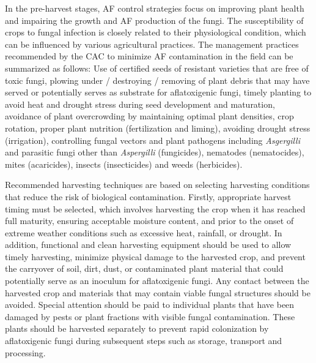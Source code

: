 In the pre-harvest stages, AF control strategies focus on improving plant health and impairing the growth and AF production of the fungi. The susceptibility of crops to fungal infection is closely related to their physiological condition, which can be influenced by various agricultural practices. The management practices recommended by the CAC to minimize AF contamination in the field can be summarized as follows: Use of certified seeds of resistant varieties that are free of toxic fungi, plowing under / destroying / removing of plant debris that may have served or potentially serves as substrate for aflatoxigenic fungi, timely planting to avoid heat and drought stress during seed development and maturation, avoidance of plant overcrowding by maintaining optimal plant densities, crop rotation, proper plant nutrition (fertilization and liming), avoiding drought stress (irrigation), controlling fungal vectors and plant pathogens including \textit{Asgergilli} and parasitic fungi other than \textit{Aspergilli} (fungicides), nematodes (nematocides), mites (acaricides), insects (insecticides) and weeds (herbicides). 


Recommended harvesting techniques are based on selecting harvesting conditions that reduce the risk of biological contamination. Firstly, appropriate harvest timing must be selected, which involves harvesting the crop when it has reached full maturity, ensuring acceptable moisture content, and prior to the onset of extreme weather conditions such as excessive heat, rainfall, or drought. In addition, functional and clean harvesting equipment should be used to allow timely harvesting, minimize physical damage to the harvested crop, and prevent the carryover of soil, dirt, dust, or contaminated plant material that could potentially serve as an inoculum for aflatoxigenic fungi. Any contact between the harvested crop and materials that may contain viable fungal structures should be avoided. Special attention should be paid to individual plants that have been damaged by pests or plant fractions with visible fungal contamination. These plants should be harvested separately to prevent rapid colonization by aflatoxigenic fungi during subsequent steps such as storage, transport and processing.


